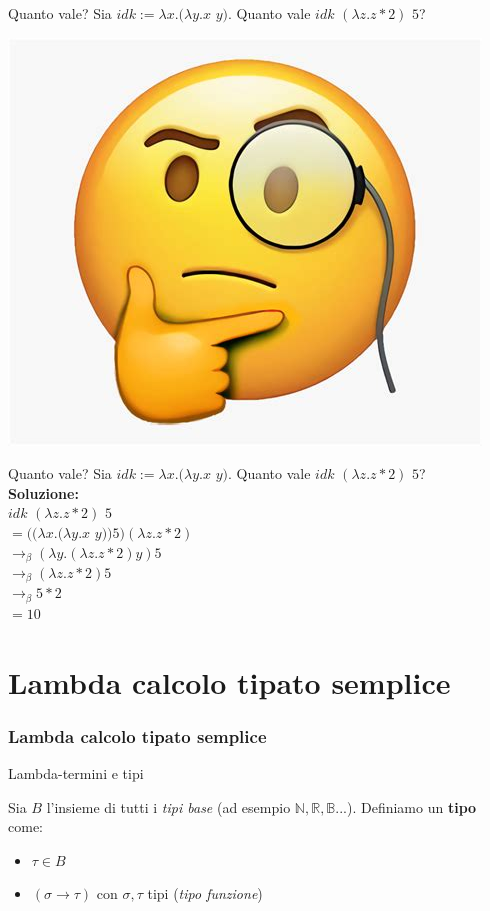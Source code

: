 \documentclass{beamer}
\newcommand{\makepart}[1]{ %
\part{#1} \frame{\partpage}
}
\begin{document}
\begin{frame}{Quanto vale?}
Sia $idk := \lambda x .(\lambda y. x $ $y)$. \alert{Quanto vale $idk$ $(\lambda z. z * 2)$  $5$?} \\
\begin{center}
\includegraphics[scale=0.40]{5.jpg}
\end{center}
\end{frame}

\begin{frame}{Quanto vale?}
Sia $idk := \lambda x .(\lambda y. x $ $y)$. \alert{Quanto vale $idk$ $(\lambda z. z * 2)$  $5$?} \\
\alert{\textbf{Soluzione:}} \\
  $idk$ $(\lambda z. z * 2)$ $5$  \\
  $= ((\lambda x . (\lambda y . x$ $y)) 5) (\lambda z. z * 2)$ \\
  $\longrightarrow_\beta (\lambda y . (\lambda z . z * 2) y) 5$ \\
  $\longrightarrow_\beta (\lambda z . z * 2) 5$ \\
  $\longrightarrow_\beta 5 * 2$ \\
  $= 10$
\end{frame}

\makepart{Lambda calcolo tipato semplice}
\section{Lambda calcolo tipato semplice}

\begin{frame}{Lambda-termini e tipi}
  \begin{definition}[Tipo]
    Sia $B$ l'insieme di tutti i \textit{tipi base} (ad esempio $\mathbb{N},
    \mathbb{R},  \mathbb{B}$...). Definiamo un \alert{\textbf{tipo}} come:
    \begin{itemize}
      \item $\tau \in B$
      \item $(\sigma \rightarrow \tau)$ con $\sigma, \tau$ tipi (\textit{tipo funzione})
    \end{itemize}
  \end{definition}
\end{frame}
\end{document}
